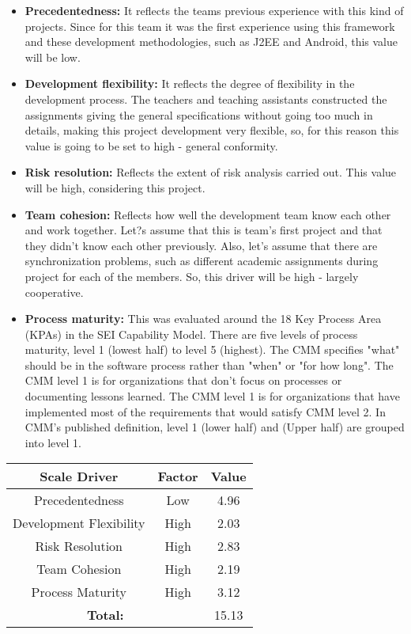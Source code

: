 \documentclass[12pt, oneside]{book}   	%
\begin{document}
\begin{itemize}
\item \textbf{Precedentedness:} It reflects the teams previous experience with this kind of projects. Since for this team it was the first experience using this framework and these development methodologies, such as J2EE and Android, this value will be low.
\item \textbf{Development flexibility: }It reflects the degree of flexibility in the development process. The teachers and teaching assistants constructed the assignments giving the general specifications without going too much in details, making this project development very flexible, so, for this reason this value is going to be set to high - general conformity.
\item \textbf{Risk resolution: }Reflects the extent of risk analysis carried out. This value will be high, considering this project.
\item \textbf{Team cohesion: }Reflects how well the development team know each other and work together. Let?s assume that this is team's first project and that they didn't know each other previously. Also, let's assume that there are synchronization problems, such as different academic assignments during project for each of the members. So, this driver will be high - largely cooperative.
\item \textbf{Process maturity: }This was evaluated around the 18 Key Process Area (KPAs) in the SEI Capability Model. 
\newline \newline
There are five levels of process maturity, level 1 (lowest half) to level 5 (highest). The CMM specifies "what" should be in the software process rather than "when" or "for how long".
\newline \newline
The CMM level 1 is for organizations that don't focus on processes or documenting lessons learned. The CMM level 1 is for organizations that have implemented most of the requirements that would satisfy CMM level 2. In CMM's published definition, level 1 (lower half) and (Upper half) are grouped into level 1.
\end{itemize}
\begin{table}[h]
\centering
\begin{tabular}{|c |c |c|}
\hline
Scale Driver & Factor & Value \\
\hline
Precedentedness & Low & 4.96 \\
Development Flexibility & High & 2.03 \\
Risk Resolution & High & 2.83 \\
Team Cohesion & High & 2.19 \\
Process Maturity & High & 3.12\\
\hline
\multicolumn{2}{|c|}{\textbf{Total:}} & 15.13 \\
\hline
\end{tabular}
\end{table}
\end{document}

